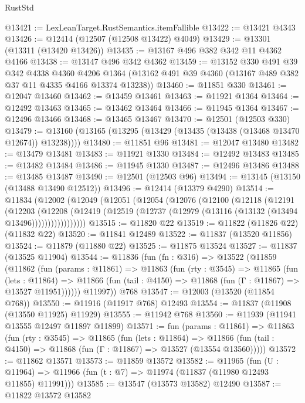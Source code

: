 \begin{lexlean}{RustStd}
\begin{coremodule}
@13421 := LexLeanTarget.RustSemantics.itemFallible
@13422 := @13421 @4343
@13426 := @12414 (@12507 (@12508 @13422) @4049)
@13429 := @13301 (@13311 (@13420 @13426))
@13435 := @13167 @496 @382 @342 @11 @4362 @4166
@13438 := @13147 @496 @342 @4362
@13459 := @13152
    @330
    @491
    @39
    @342
    @4338
    @4360
    @4206
    @1364
    (@13162 @491 @39 @4360 (@13167 @489 @382 @37 @11 @4335 @4166 @13374 @13238))
@13460 := @11851 @330
@13461 := @12047 @13460
@13462 := @13459 @13461
@13463 := @11921 @1364
@13464 := @12492 @13463
@13465 := @13462 @13464
@13466 := @11945 @1364
@13467 := @12496 @13466
@13468 := @13465 @13467
@13470 := @12501 (@12503 @330)
@13479 := @13160 (@13165 (@13295 (@13429 (@13435 (@13438 (@13468 @13470 @12674)) @13238))))
@13480 := @11851 @96
@13481 := @12047 @13480
@13482 := @13479 @13481
@13483 := @11921 @1330
@13484 := @12492 @13483
@13485 := @13482 @13484
@13486 := @11945 @1330
@13487 := @12496 @13486
@13488 := @13485 @13487
@13490 := @12501 (@12503 @96)
@13494 := @13145 (@13150 (@13488 @13490 @12512))
@13496 := @12414 (@13379 @4290)
@13514 := @11834
    (@12002
      (@12049
        (@12051
          (@12054
            (@12076
              (@12100
                (@12118
                  (@12191
                    (@12203
                      (@12208
                        (@12419
                          (@12519 (@12737 (@12979 (@13116 (@13132 (@13494 @13496)))))))))))))))))
@13515 := @11820 @22
@13519 := @11822 (@11826 @22) (@11832 @22)
@13520 := @11841 @12489
@13522 := @11837 (@13520 @11856)
@13524 := @11879 (@11880 @22)
@13525 := @11875 @13524
@13527 := @11837 (@13525 @11904)
@13544 := @11836
    (fun (fn : @316) =>
    @13522
      (@11859
        (@11862
          (fun (params : @11861) =>
          @11863
            (fun (rty : @3545) =>
            @11865
              (fun (lets : @11864) =>
              @11866 (fun (tail : @4150) => @11868 (fun (Γ : @11867) => @13527 @11951))))))
        @11997))
    @768
@13547 := @12003 (@13520 (@11854 @768))
@13550 := @11916 (@11917 @768) @12493
@13554 := @11837 (@11908 (@13550 @11925) @11929)
@13555 := @11942 @768
@13560 := @11939 (@11941 @13555 @12497 @11897 @11899)
@13571 := fun (params : @11861) =>
  @11863
    (fun (rty : @3545) =>
    @11865
      (fun (lets : @11864) =>
      @11866 (fun (tail : @4150) => @11868 (fun (Γ : @11867) => @13527 (@13554 @13560)))))
@13572 := @11862 @13571
@13573 := @11859 @13572
@13582 := @11965
    (fun (U : @11964) => @11966 (fun (t : @7) => @11974 (@11837 (@11980 @12493 @11855) @11991)))
@13585 := @13547 (@13573 @13582) @12490
@13587 := @11822 @13572 @13582

\end{coremodule}
\end{lexlean}
